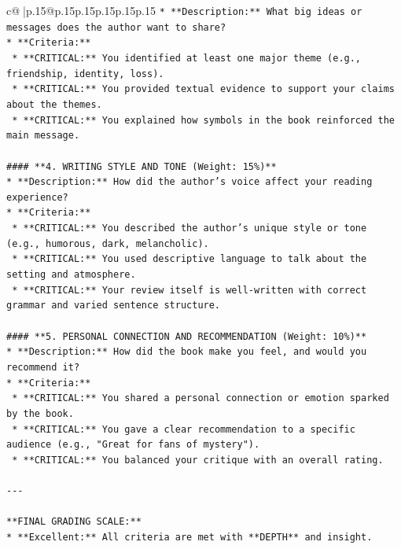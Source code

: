 \documentclass{article}
\begin{document}
{\begin{supertabular}{c@{$\;$}|p{.15\linewidth}@{}p{.15\linewidth}p{.15\linewidth}p{.15\linewidth}p{.15\linewidth}p{.15\linewidth}}
{{{\texttt{*   **Description:** What big ideas or messages does the author want to share?} \\
\texttt{*   **Criteria:**} \\
\texttt{    *   **CRITICAL:** You identified at least one major theme (e.g., friendship, identity, loss).} \\
\texttt{    *   **CRITICAL:** You provided textual evidence to support your claims about the themes.} \\
\texttt{    *   **CRITICAL:** You explained how symbols in the book reinforced the main message.} \\
\\ 
\texttt{\#\#\#\# **4. WRITING STYLE AND TONE (Weight: 15\%)**} \\
\texttt{*   **Description:** How did the author's voice affect your reading experience?} \\
\texttt{*   **Criteria:**} \\
\texttt{    *   **CRITICAL:** You described the author's unique style or tone (e.g., humorous, dark, melancholic).} \\
\texttt{    *   **CRITICAL:** You used descriptive language to talk about the setting and atmosphere.} \\
\texttt{    *   **CRITICAL:** Your review itself is well{-}written with correct grammar and varied sentence structure.} \\
\\ 
\texttt{\#\#\#\# **5. PERSONAL CONNECTION AND RECOMMENDATION (Weight: 10\%)**} \\
\texttt{*   **Description:** How did the book make you feel, and would you recommend it?} \\
\texttt{*   **Criteria:**} \\
\texttt{    *   **CRITICAL:** You shared a personal connection or emotion sparked by the book.} \\
\texttt{    *   **CRITICAL:** You gave a clear recommendation to a specific audience (e.g., "Great for fans of mystery").} \\
\texttt{    *   **CRITICAL:** You balanced your critique with an overall rating.} \\
\\ 
\texttt{{-}{-}{-}} \\
\\ 
\texttt{**FINAL GRADING SCALE:**} \\
\texttt{*   **Excellent:** All criteria are met with **DEPTH** and insight.} \\
}}}
\end{supertabular}}
\end{document}
